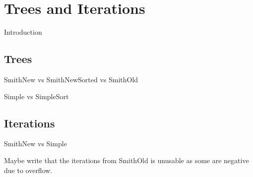 \section{Trees and Iterations}
\label{sec:trees-iterations}

Introduction

\subsection{Trees}
\label{sec:trees}

SmithNew vs SmithNewSorted vs SmithOld

Simple vs SimpleSort

\subsection{Iterations}
\label{sec:iterations}

SmithNew vs Simple

Maybe write that the iterations from SmithOld is unusable as some are negative
due to overflow.

\chapterbreak{}

